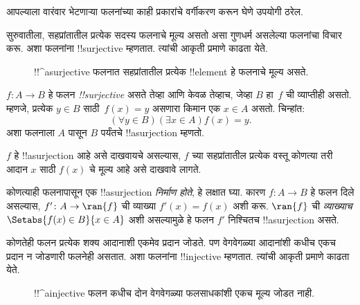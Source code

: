 \documentclass[../../../include/open-logic-section]{subfiles}
\begin{document}

\begin{explain}
आपल्याला वारंवार भेटणाऱ्या फलनांच्या काही प्रकारांचे वर्गीकरण करून
घेणे उपयोगी ठरेल.

सुरुवातीला, सहप्रांतातील प्रत्येक सदस्य फलनाचे मूल्य असतो असा गुणधर्म
असलेल्या फलनांचा विचार करू. अशा फलनांना !!{surjective} म्हणतात.
त्यांची आकृती  प्रमाणे काढता येते.

\begin{figure}
  \caption{!!^a{surjective} फलनात सहप्रांतातील प्रत्येक !!{element}
    हे फलनाचे मूल्य असते.}
\end{figure}
\end{explain}

\begin{defn}
$f \colon A \rightarrow B$ हे फलन \emph{!!{surjective}} असते तेव्हा
आणि केवळ तेव्हाच, जेव्हा $B$ हा~$f$ ची व्याप्तीही असतो. म्हणजे,
प्रत्येक $y \in B$ साठी~$f(x) = y$ असणारा किमान एक $x \in A$
असतो. चिन्हांत:
\[
  (\forall y \in B)(\exists x \in A)f(x) = y.
\]
अशा फलनाला $A$ पासून $B$ पर्यंतचे !!a{surjection} म्हणतो.
\end{defn}

\begin{explain}
$f$ हे !!a{surjection} आहे असे दाखवायचे असल्यास, $f$ च्या सहप्रांतातील
प्रत्येक वस्तू कोणत्या तरी आदान $x$ साठी $f(x)$ चे मूल्य आहे असे दाखवावे लागते.

कोणत्याही फलनापासून एक !!a{surjection} \emph{निर्माण होते}, हे लक्षात घ्या.
कारण $f \colon A \to B$ हे फलन दिले असल्यास, $f' \colon A \to \ran{f}$
ची व्याख्या $f'(x) = f(x)$ अशी करू. $\ran{f}$ ची \emph{व्याख्याच}
$\Setabs{f(x) \in B}{x \in A}$ अशी असल्यामुळे हे फलन $f'$ निश्चितच
!!a{surjection} असते.
\end{explain}

\begin{explain}
कोणतेही फलन प्रत्येक शक्य आदानाशी एकमेव प्रदान जोडते. पण वेगवेगळ्या
आदानांशी कधीच एकच प्रदान न जोडणारी फलनेही असतात. अशा फलनांना
!!{injective} म्हणतात. त्यांची आकृती  प्रमाणे काढता येते.
\begin{figure}
  \caption{!!^a{injective} फलन कधीच दोन वेगवेगळ्या फलसाधकांशी
    एकच मूल्य जोडत नाही.}
\end{figure}
\end{explain}
\end{document}
